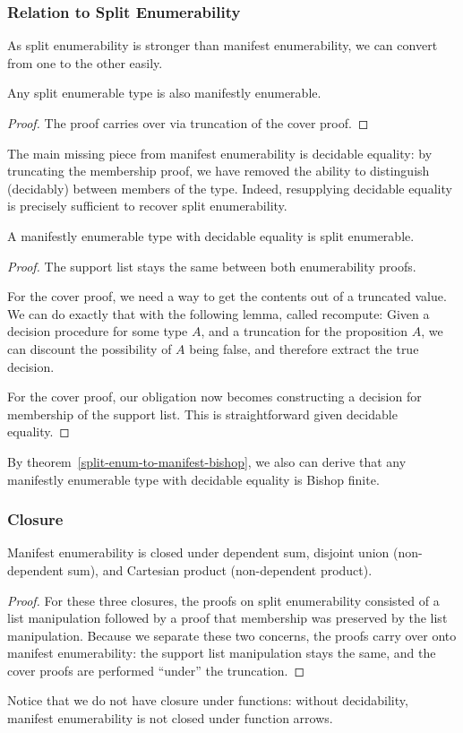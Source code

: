 \subsubsection{Relation to Split Enumerability}
As split enumerability is stronger than manifest enumerability, we can convert
from one to the other easily.
\begin{lemma}
  Any split enumerable type is also manifestly enumerable.
\end{lemma}
\begin{proof}
  The proof carries over via truncation of the cover proof.
\end{proof}
The main missing piece from manifest enumerability is decidable equality: by
truncating the membership proof, we have removed the ability to distinguish
(decidably) between members of the type.
Indeed, resupplying decidable equality is precisely sufficient to recover split
enumerability.

\begin{theorem} \label{manifest-enum-to-split}
  A manifestly enumerable type with decidable equality is split enumerable.
\end{theorem}
\begin{proof}
  The support list stays the same between both enumerability proofs.

  For the cover proof, we need a way to get the contents out of a truncated
  value.
  We can do exactly that with the following lemma, called recompute:
  Given a decision procedure for some type \(A\), and a truncation for the
  proposition \(A\), we can discount the possibility of \(A\) being false, and
  therefore extract the true decision.

  For the cover proof, our obligation now becomes constructing a decision for
  membership of the support list.
  This is straightforward given decidable equality.

\end{proof}
By theorem~\ref{split-enum-to-manifest-bishop}, we also can derive that any
manifestly enumerable type with decidable equality is Bishop finite.
\subsubsection{Closure}
\begin{lemma}
  Manifest enumerability is closed under dependent sum, disjoint union
  (non-dependent sum), and Cartesian product (non-dependent product).
\end{lemma}
\begin{proof}
  For these three closures, the proofs on split enumerability consisted of a
  list manipulation followed by a proof that membership was preserved by the
  list manipulation.
  Because we separate these two concerns, the proofs carry over onto manifest
  enumerability: the support list manipulation stays the same, and the
  cover proofs are performed ``under'' the truncation.
\end{proof}
Notice that we do not have closure under functions: without decidability,
manifest enumerability is not closed under function arrows.

